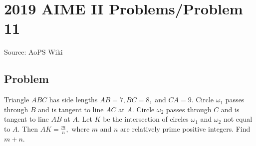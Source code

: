 \documentclass[12pt]{article}
\begin{document}
\section*{{2019 AIME II Problems/Problem 11}}
Source: AoPS Wiki

\subsection*{Problem}
Triangle $ABC$ has side lengths $AB=7, BC=8,$ and $CA=9.$ Circle $\omega_1$ passes through $B$ and is tangent to line $AC$ at $A.$ Circle $\omega_2$ passes through $C$ and is tangent to line $AB$ at $A.$ Let $K$ be the intersection of circles $\omega_1$ and $\omega_2$ not equal to $A.$ Then $AK=\tfrac mn,$ where $m$ and $n$ are relatively prime positive integers. Find $m+n.$
\end{document}
